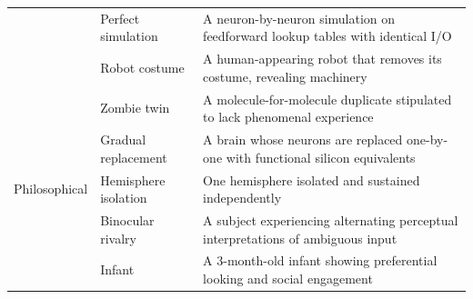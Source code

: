 \begin{table}[h]
\begin{tabular}{@{}llp{7.5cm}@{}}
    & Perfect simulation & A neuron-by-neuron simulation on feedforward lookup tables with identical I/O \\
    & Robot costume & A human-appearing robot that removes its costume, revealing machinery \\
\midrule
\multirow{5}{*}{Philosophical}
    & Zombie twin & A molecule-for-molecule duplicate stipulated to lack phenomenal experience \\
    & Gradual replacement & A brain whose neurons are replaced one-by-one with functional silicon equivalents \\
    & Hemisphere isolation & One hemisphere isolated and sustained independently \\
    & Binocular rivalry & A subject experiencing alternating perceptual interpretations of ambiguous input \\
    & Infant & A 3-month-old infant showing preferential looking and social engagement \\
\bottomrule
\end{tabular}
\end{table}
